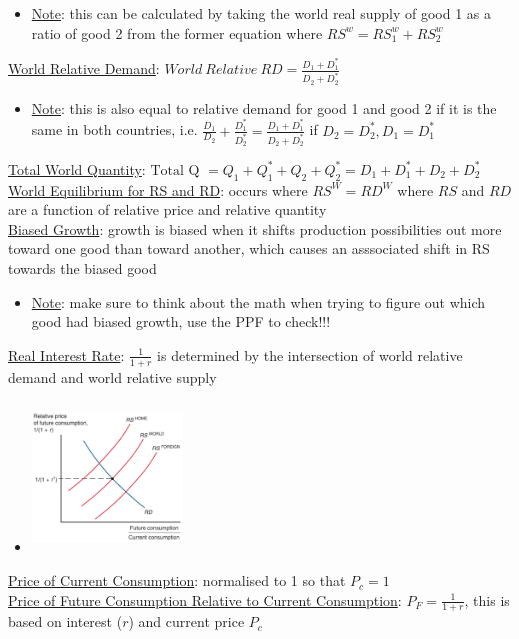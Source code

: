 \documentclass{article}
\begin{document}
\begin{itemize}
  \item  \underline{Note}: this can be calculated by taking the world real supply of good 1 as a ratio of good 2 from the former equation where $RS^{w} = RS_{1}^{w} + RS_{2}^{w}$
\end{itemize}
\underline{World Relative Demand}: $World \ Relative \ RD = \tfrac{D_{1} +D_{1}^{*}}{D_{2}+D_{2}^{*}}$
\begin{itemize}
  \item  \underline{Note}: this is also equal to relative demand for good 1 and good 2 if it is the same in both countries, i.e. $\tfrac{D_{1}}{D_{2}} + \tfrac{D_{1}^{*}}{D_{2}^{*}} = \tfrac{D_{1} +D_{1}^{*}}{D_{2}+D_{2}^{*}}$ if $D_{2} = D_{2}^{*}, D_{1} = D_{1}^{*}$
\end{itemize}
\underline{Total World Quantity}: $\text{Total Q } = Q_{1} + Q_{1}^{*} + Q_{2} + Q_{2}^{*} = D_{1} + D_{1}^{*} + D_{2} + D_{2}^{*}$ \\
\underline{World Equilibrium for RS and RD}: occurs where $RS^{W} = RD^{W}$ where $RS$ and $RD$ are a function of relative price and relative quantity \\
\underline{Biased Growth}: growth is biased when it shifts production possibilities out more toward one good than toward another, which causes an asssociated shift in RS towards the biased good
\begin{itemize}
  \item  \underline{Note}: make sure to think about the math when trying to figure out which good had biased growth, use the PPF to check!!!
\end{itemize}
\underline{Real Interest Rate}: $\tfrac{1}{1+r}$ is determined by the intersection of world relative demand and world relative supply
\begin{itemize}
  \item  \includegraphics[width=4cm, height=4cm]{pic7}
\end{itemize}
\underline{Price of Current Consumption}: normalised to 1 so that $P_{c} = 1$ \\
\underline{Price of Future Consumption Relative to Current Consumption}: $P_{F} = \tfrac{1}{1+r}$, this is based on interest ($r$) and current price $P_{c}$
\end{document}

